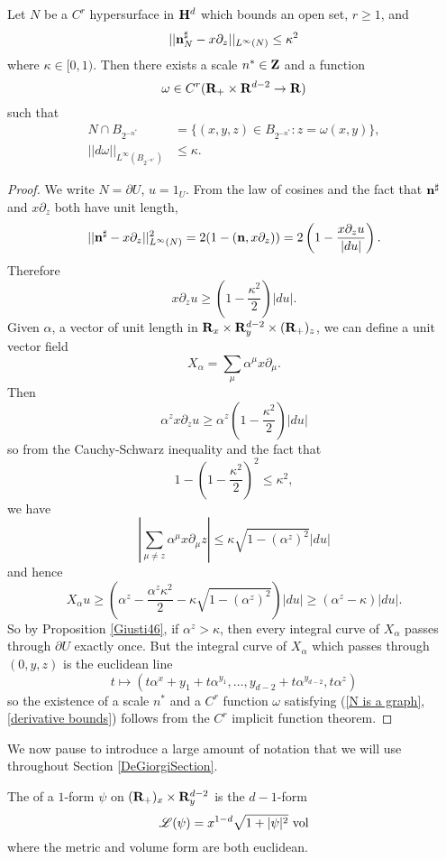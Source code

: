 \begin{lemma}\label{hopfKilling}
Let $N$ be a $C^r$ hypersurface in $\mathbf H^d$ which bounds an open set, $r \geq 1$, and 
$$||\mathbf n_N^\sharp - x\partial_z||_{L^\infty(N)} \leq \kappa^2$$
where $\kappa \in [0, 1)$.
Then there exists a scale $n^* \in \mathbf{Z}$ and a function
$$\omega \in C^r(\mathbf{R}_+ \times \mathbf{R}^{d - 2} \to \mathbf{R})$$
such that 
\begin{align}
    N \cap B_{2^{-n^*}} &= \{(x, y, z) \in B_{2^{-n^*}}: z = \omega(x, y)\}, \label{N is a graph}\\
    ||d\omega||_{L^\infty(B_{2^{-n^*}})} &\leq \kappa. \label{derivative bounds}
\end{align}
\end{lemma}
\begin{proof}
We write $N = \partial U$, $u = 1_U$.
From the law of cosines and the fact that $\mathbf n^\sharp$ and $x\partial_z$ both have unit length,
$$||\mathbf n^\sharp - x\partial_z||_{L^\infty(N)}^2 = 2(1 - (\mathbf n, x\partial_z)) = 2\left(1 - \frac{x\partial_z u}{|du|}\right).$$
Therefore 
$$x\partial_z u \geq \left(1 - \frac{\kappa^2}{2}\right) |du|.$$
Given $\alpha$, a vector of unit length in $\mathbf{R}_x \times \mathbf{R}^{d - 2}_y \times (\mathbf{R}_+)_z$, we can define a unit vector field
$$X_\alpha = \sum_\mu \alpha^\mu x\partial_\mu.$$
Then 
$$\alpha^z x\partial_z u \geq \alpha^z \left(1 - \frac{\kappa^2}{2}\right) |du|$$
so from the Cauchy-Schwarz inequality and the fact that 
$$1 - \left(1 - \frac{\kappa^2}{2}\right)^2 \leq \kappa^2,$$
we have 
$$\left|\sum_{\mu \neq z} \alpha^\mu x\partial_\mu z\right| \leq \kappa\sqrt{1 - (\alpha^z)^2} |du|$$
and hence 
$$X_\alpha u \geq \left(\alpha^z - \frac{\alpha^z \kappa^2}{2} - \kappa\sqrt{1 - (\alpha^z)^2}\right)|du| \geq (\alpha^z - \kappa)|du|.$$
So by Proposition \ref{Giusti46}, if $\alpha^z > \kappa$, then every integral curve of $X_\alpha$ passes through $\partial U$ exactly once.
But the integral curve of $X_\alpha$ which passes through $(0, y, z)$ is the euclidean line 
$$t \mapsto (t \alpha^x + y_1 + t \alpha^{y_1}, \dots, y_{d - 2} + t \alpha^{y_{d - 2}}, t \alpha^z)$$
so the existence of a scale $n^*$ and a $C^r$ function $\omega$ satisfying (\ref{N is a graph}, \ref{derivative bounds}) follows from the $C^r$ implicit function theorem. 
\end{proof}

We now pause to introduce a large amount of notation that we will use throughout Section \ref{DeGiorgiSection}.

\begin{definition}
The  of a $1$-form $\psi$ on $(\mathbf{R}_+)_x \times \mathbf{R}^{d - 2}_y$ is the $d-1$-form
$$\mathscr L(\psi) = x^{1 - d} \sqrt{1 + |\psi|^2} ~\mathrm{vol}$$
where the metric and volume form are both euclidean.
\end{definition}

